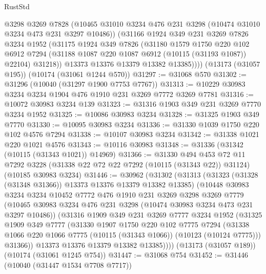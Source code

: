 \begin{lexlean}{RustStd}
\begin{coremodule}
          @3298
          @3269
          @7828
          (@10465 @31010 @3234 @476 @231 @3298 (@10474 @31010 @3234 @473 @231 @3297 @10486))
          (@31166
            @1924
            @349
            @231
            @3269
            @7826
            @3234
            @1952
            (@31175
              @1924
              @349
              @7826
              (@31180
                @1579
                @1750
                @220
                @102
                @6912
                @7294
                (@31188 @1087 @220 @1087 @6912 (@10115 (@31193 @1087)) @22104)
                @31218))
            @13373
            @13376
            @13379
            @13382
            @13385))))
    (@13173 (@31057 @195))
    (@10174 (@31061 @1244 @570))
@31297 := @31068 @570
@31302 := @31296 (@10040 (@31297 @1900 @7753 @7767))
@31313 := @10229 @30983 @3234 @3234 @1904 @476 @1910 @231 @3269 @7772 @3269 @7781
@31316 := @10072 @30983 @3234 @139
@31323 := @31316 @1903 @349 @231 @3269 @7770 @3234 @1952
@31325 := @10086 @30983 @3234
@31328 := @31325 @1903 @349 @7770
@31330 := @10095 @30983 @3234
@31336 := @31330 @1039 @1750 @220 @102 @4576 @7294
@31338 := @10107 @30983 @3234
@31342 := @31338 @1021 @220 @1021 @4576
@31343 := @10116 @30983
@31348 := @31336 (@31342 (@10115 (@31343 @1021)) @14969)
@31366 := @31330
    @494
    @453
    @72
    @11
    @7292
    @3228
    (@31338 @22 @72 @22 @7292 (@10115 (@31343 @22)) @31124)
    (@10185 @30983 @3234)
@31446 := @30962
    (@31302
      (@31313
        (@31323 (@31328 (@31348 @31366)) @13373 @13376 @13379 @13382 @13385)
        (@10448
          @30983
          @3234
          @3234
          @10452
          @7772
          @476
          @1910
          @231
          @3269
          @3298
          @3269
          @7779
          (@10465 @30983 @3234 @476 @231 @3298 (@10474 @30983 @3234 @473 @231 @3297 @10486))
          (@31316
            @1909
            @349
            @231
            @3269
            @7777
            @3234
            @1952
            (@31325
              @1909
              @349
              @7777
              (@31330
                @1907
                @1750
                @220
                @102
                @7775
                @7294
                (@31338 @1066 @220 @1066 @7775 (@10115 (@31343 @1066)) (@10123 (@10124 @7775)))
                @31366))
            @13373
            @13376
            @13379
            @13382
            @13385))))
    (@13173 (@31057 @189))
    (@10174 (@31061 @1245 @754))
@31447 := @31068 @754
@31452 := @31446 (@10040 (@31447 @1534 @7708 @7717))

\end{coremodule}
\end{lexlean}
